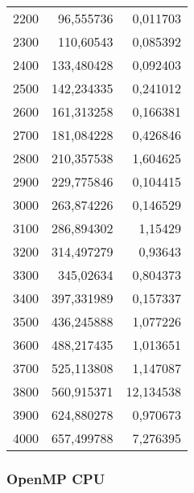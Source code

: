 \begin{tabular}{r r r}
2200 & 96,555736 & 0,011703 \\
2300 & 110,60543 & 0,085392 \\
2400 & 133,480428 & 0,092403 \\
2500 & 142,234335 & 0,241012 \\
2600 & 161,313258 & 0,166381 \\
2700 & 181,084228 & 0,426846 \\
2800 & 210,357538 & 1,604625 \\
2900 & 229,775846 & 0,104415 \\
3000 & 263,874226 & 0,146529 \\
3100 & 286,894302 & 1,15429 \\
3200 & 314,497279 & 0,93643 \\
3300 & 345,02634 & 0,804373 \\
3400 & 397,331989 & 0,157337 \\
3500 & 436,245888 & 1,077226 \\
3600 & 488,217435 & 1,013651 \\
3700 & 525,113808 & 1,147087 \\
3800 & 560,915371 & 12,134538 \\
3900 & 624,880278 & 0,970673 \\
4000 & 657,499788 & 7,276395 \\
\end{tabular}

\subsubsection{OpenMP CPU}

